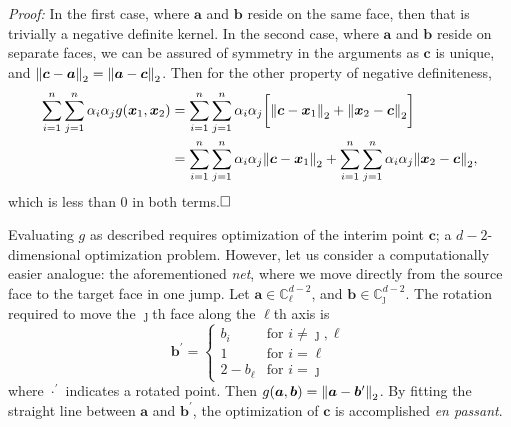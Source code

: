 {\em Proof:}
In the first case, where $\bm{a}$ and $\bm{b}$ reside on the same face, then that is trivially a
  negative definite kernel.  In the second case, where $\bm{a}$ and $\bm{b}$ reside on separate
  faces, we can be assured of symmetry in the arguments as $\bm{c}$ is unique, and $\pnorm{\bm{c} - \bm{a}}{2} = \pnorm{\bm{a} - \bm{c}}{2}$.  Then for the other property of negative definiteness,
  \begin{equation*}
    \begin{aligned}
      \sum_{i = 1}^n\sum_{j = 1}^n \alpha_i\alpha_j g(\bm{x}_1,\bm{x}_2) &= \sum_{i = 1}^n\sum_{j = 1}^n \alpha_i\alpha_j \bigg[\pnorm{\bm{c} - \bm{x}_1}{2} + \pnorm{\bm{x}_2 - \bm{c}}{2}\bigg]\\
      &= \sum_{i = 1}^n\sum_{j = 1}^n \alpha_i\alpha_j\pnorm{\bm{c} - \bm{x}_1}{2} + \sum_{i = 1}^n\sum_{j = 1}^n \alpha_i\alpha_j\pnorm{\bm{x}_2 - \bm{c}}{2},
    \end{aligned}
  \end{equation*}
  which is less than $0$ in both terms.$\hfill\Box$

Evaluating $g$ as described requires optimization of the interim point $\bm{c}$; a $d-2$-dimensional optimization problem.  However, let us consider a computationally easier analogue: the aforementioned \emph{net}, where we move directly from the source face to the target face in one jump. Let $\bm{a} \in {\mathbb C}_{\ell}^{d-2}$, and $\bm{b} \in {\mathbb C}_{\jmath}^{d-2}$.  The rotation required to move the $\jmath$th face along the $\ell$th axis is
\begin{equation}
    \bm{b}^{\prime} = 
    \begin{cases}
        b_{i} &\text{for }i\neq \jmath,\ell\\
        1 &\text{for }i = \ell\\
        2 - b_{\ell} &\text{for }i = \jmath
    \end{cases}
\end{equation}
where $\cdot^{\prime}$ indicates a rotated point.  Then $g(\bm{a},\bm{b}) = \pnorm{\bm{a} - \bm{b}^{\prime}}{2}$.  By fitting the straight line between $\bm{a}$ and $\bm{b}^{\prime}$, the optimization of $\bm{c}$ is accomplished \emph{en passant}.

